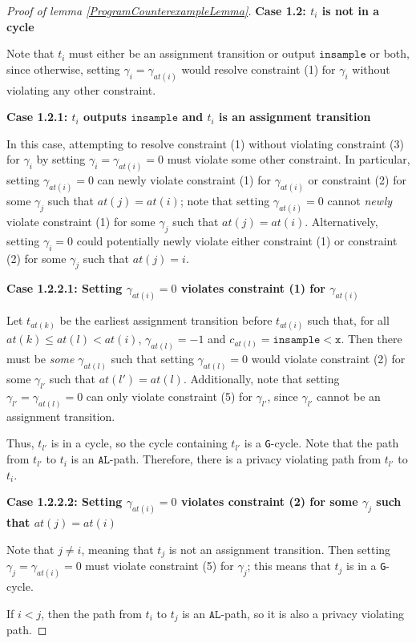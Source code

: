 \documentclass[12pt]{article}
\newcommand{\lguard}[1][x]{\texttt{insample} < #1}
\newcommand{\gcycle}{\texttt{G}-cycle}
\theoremstyle{definition}
\begin{document}
\begin{proof}[Proof of lemma \ref{ProgramCounterexampleLemma}]
    \textbf{Case 1.2: $t_i$ is not in a cycle}

    Note that $t_i$ must either be an assignment transition or output $\texttt{insample}$ or both, since otherwise, setting $\gamma_i = \gamma_{at(i)}$ would resolve constraint (1) for $\gamma_i$ without violating any other constraint. 

    \textbf{Case 1.2.1: $t_i$ outputs $\texttt{insample}$ and $t_i$ is an assignment transition}

    In this case, attempting to resolve constraint (1) without violating constraint (3) for $\gamma_i$ by setting $\gamma_i = \gamma_{at(i)} = 0$ must violate some other constraint. In particular, setting $\gamma_{at(i)} = 0$ can newly violate constraint (1) for $\gamma_{at(i)}$ or constraint (2) for some $\gamma_j$ such that $at(j) = at(i)$; note that setting $\gamma_{at(i)}=0$ cannot \textit{newly} violate constraint (1) for some $\gamma_j$ such that $at(j) = at(i)$. 
    Alternatively, setting $\gamma_i = 0$ could potentially newly violate either constraint (1) or constraint (2) for some $\gamma_j$ such that $at(j) = i$. 

    \textbf{Case 1.2.2.1: Setting $\gamma_{at(i)} =0$ violates constraint (1) for $\gamma_{at(i)}$}

    Let $t_{at(k)}$ be the earliest assignment transition before $t_{at(i)}$ such that, for all $at(k)\leq at(l)< at(i)$, $\gamma_{at(l)} = -1$ and $c_{at(l)} = \lguard[\texttt{x}]$. Then there must be \textit{some} $\gamma_{at(l)}$ such that setting $\gamma_{at(l)} = 0$ would violate constraint (2) for some $\gamma_{l'}$ such that $at(l') = at(l)$.  
    Additionally, note that setting $\gamma_{l'} = \gamma_{at(l)} = 0$ can only violate constraint (5) for $\gamma_{l'}$, since $\gamma_{l'}$ cannot be an assignment transition. 
    
    Thus, $t_{l'}$ is in a cycle, so the cycle containing $t_{l'}$ is a \gcycle. Note that the path from $t_{l'}$ to $t_i$ is an $\texttt{AL}$-path. Therefore, there is a privacy violating path from $t_{l'}$ to $t_i$.

    \textbf{Case 1.2.2.2: Setting $\gamma_{at(i)} =0$ violates constraint (2) for some $\gamma_j$ such that $at(j) = at(i)$}

    Note that $j\neq i$, meaning that $t_j$ is not an assignment transition. Then setting $\gamma_j = \gamma_{at(i)} = 0$ must violate constraint (5) for $\gamma_j$; this means that $t_j$ is in a \gcycle. 

    If $i<j$, then the path from $t_i$ to $t_j$ is an $\texttt{AL}$-path, so it is also a privacy violating path.


\end{proof}
\end{document}
